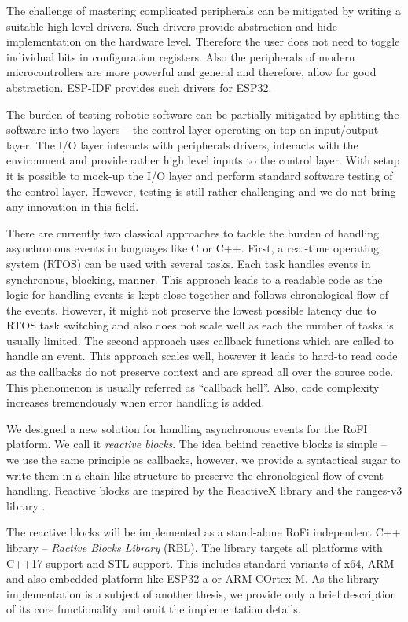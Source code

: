 The challenge of mastering complicated peripherals can be mitigated by writing a
suitable high level drivers. Such drivers provide abstraction and hide
implementation on the hardware level. Therefore the user does not need to toggle
individual bits in configuration registers. Also the peripherals of modern
microcontrollers are more powerful and general and therefore, allow for good
abstraction. ESP-IDF provides such drivers for ESP32.

The burden of testing robotic software can be partially mitigated by splitting
the software into two layers -- the control layer operating on top an
input/output layer. The I/O layer interacts with peripherals drivers, interacts
with the environment and provide rather high level inputs to the control layer.
With setup it is possible to mock-up the I/O layer and perform standard software
testing of the control layer. However, testing is still rather challenging and
we do not bring any innovation in this field.

There are currently two classical approaches to tackle the burden of handling
asynchronous events in languages like C or C++. First, a real-time operating
system (RTOS) can be used with several tasks. Each task handles events in
synchronous, blocking, manner. This approach leads to a readable code as the
logic for handling events is kept close together and follows chronological flow
of the events. However, it might not preserve the lowest possible latency due to
RTOS task switching and also does not scale well as each the number of tasks is
usually limited. The second approach uses callback functions which are called to
handle an event. This approach scales well, however it leads to hard-to read
code as the callbacks do not preserve context and are spread all over the source
code. This phenomenon is usually referred as ``callback hell''. Also, code
complexity increases tremendously when error handling is added.

We designed a new solution for handling asynchronous events for the RoFI
platform. We call it \emph{reactive blocks}. The idea behind reactive blocks is
simple -- we use the same principle as callbacks, however, we provide a
syntactical sugar to write them in a chain-like structure to preserve the
chronological flow of event handling. Reactive blocks are inspired by the
ReactiveX library \cite{noauthor_reactivex_nodate} and the ranges-v3 library
\cite{noauthor_range-v3_nodate}.

The reactive blocks will be implemented as a stand-alone RoFi independent C++
library -- \emph{Ractive Blocks Library} (RBL). The library targets all
platforms with C++17 support and STL support. This includes standard variants of
x64, ARM and also embedded platform like ESP32 a or ARM COrtex-M. As the library
implementation is a subject of another thesis, we provide only a brief
description of its core functionality and omit the implementation details.

